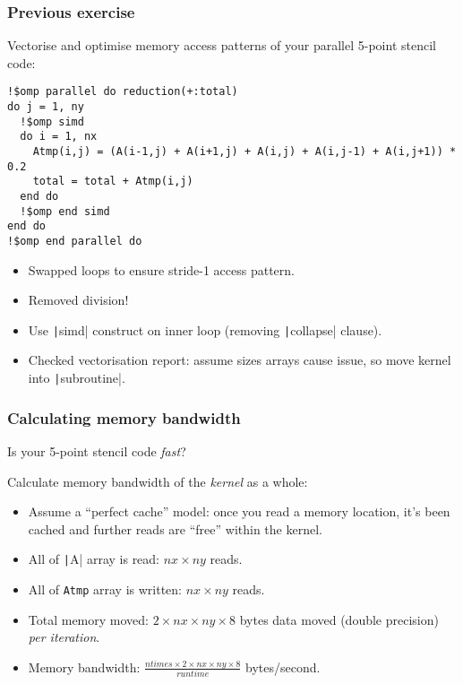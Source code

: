 \documentclass{beamer}
\begin{document}
\begin{frame}[fragile]
\frametitle{Previous exercise}

Vectorise and optimise memory access patterns of your parallel 5-point stencil code:
\begin{verbatim}
!$omp parallel do reduction(+:total)
do j = 1, ny
  !$omp simd
  do i = 1, nx
    Atmp(i,j) = (A(i-1,j) + A(i+1,j) + A(i,j) + A(i,j-1) + A(i,j+1)) * 0.2
    total = total + Atmp(i,j)
  end do
  !$omp end simd
end do
!$omp end parallel do
\end{verbatim}

\begin{itemize}
  \item Swapped loops to ensure stride-1 access pattern.
  \item Removed division!
  \item Use \texttt|simd| construct on inner loop (removing \texttt|collapse| clause).
  \item Checked vectorisation report: assume sizes arrays cause issue, so move kernel into \texttt|subroutine|.
\end{itemize}

\end{frame}

\begin{frame}
\frametitle{Calculating memory bandwidth}
Is your 5-point stencil code \emph{fast}?

\pause

Calculate memory bandwidth of the \emph{kernel} as a whole:
\begin{itemize}[<+->]
  \item Assume a ``perfect cache'' model: once you read a memory location, it's been cached and further reads are ``free'' within the kernel.
  \item All of \texttt|A| array is read: $nx \times ny$ reads.
  \item All of \texttt{Atmp} array is written: $nx \times ny$ reads.
  \item Total memory moved: $2 \times nx \times ny \times 8$ bytes data moved (double precision) \emph{per iteration}.
  \item Memory bandwidth: $\frac{ntimes \times 2 \times nx \times ny \times 8}{runtime}$ bytes/second.
\end{itemize}


\end{frame}
\end{document}
